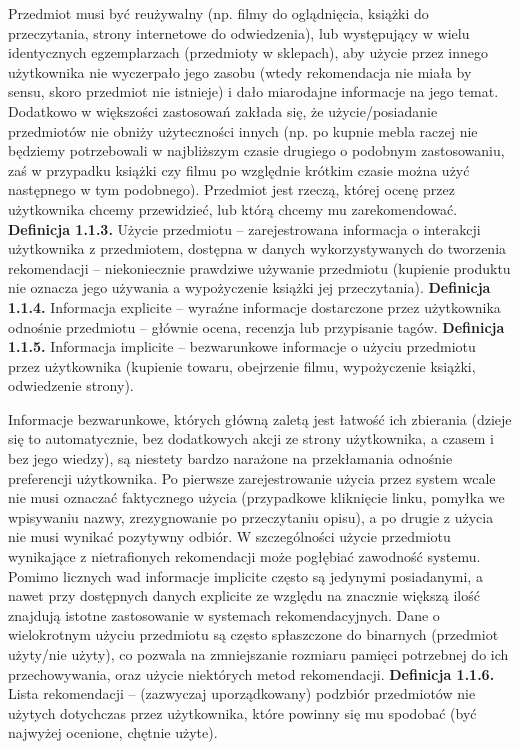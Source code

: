 \documentclass{pracamgr}
\begin{document}
    Przedmiot musi być reużywalny (np. filmy do oglądnięcia, książki do przeczytania, strony internetowe do odwiedzenia),
    lub występujący w wielu identycznych egzemplarzach (przedmioty w sklepach), aby użycie przez innego użytkownika nie wyczerpało jego zasobu
    (wtedy rekomendacja nie miała by sensu, skoro przedmiot nie istnieje) i dało miarodajne informacje na jego temat.
    Dodatkowo w większości zastosowań zakłada się, że użycie/posiadanie przedmiotów nie obniży użyteczności innych
    (np. po kupnie mebla raczej nie będziemy potrzebowali w najbliższym czasie drugiego o podobnym zastosowaniu,
    zaś w przypadku książki czy filmu po względnie krótkim czasie można użyć następnego w tym podobnego).
    Przedmiot jest rzeczą, której ocenę przez użytkownika chcemy przewidzieć, lub którą chcemy mu zarekomendować.\newline\newline
   \textbf{Definicja 1.1.3.} Użycie przedmiotu -- zarejestrowana informacja o interakcji użytkownika z przedmiotem,
   dostępna w danych wykorzystywanych do tworzenia rekomendacji -- niekoniecznie prawdziwe używanie przedmiotu
   (kupienie produktu nie oznacza jego używania a wypożyczenie książki jej przeczytania). \newline\newline
   \textbf{Definicja 1.1.4.} Informacja explicite -- wyraźne informacje dostarczone przez użytkownika odnośnie przedmiotu -- głównie
    ocena, recenzja lub przypisanie tagów.\newline\newline
   \textbf{Definicja 1.1.5.} Informacja implicite -- bezwarunkowe informacje o użyciu przedmiotu przez użytkownika
    (kupienie towaru, obejrzenie filmu, wypożyczenie książki, odwiedzenie strony).\newline
    
    Informacje bezwarunkowe, których główną zaletą jest łatwość ich zbierania
    (dzieje się to automatycznie, bez dodatkowych akcji ze strony użytkownika, a czasem i bez jego wiedzy),
    są niestety bardzo narażone na przekłamania odnośnie preferencji użytkownika.
    Po pierwsze zarejestrowanie użycia przez system wcale nie musi oznaczać faktycznego użycia
    (przypadkowe kliknięcie linku, pomyłka we wpisywaniu nazwy, zrezygnowanie po przeczytaniu opisu), 
    a po drugie z użycia nie musi wynikać pozytywny odbiór.
    W szczególności użycie przedmiotu wynikające z nietrafionych rekomendacji może pogłębiać zawodność systemu.
    Pomimo licznych wad informacje implicite często są jedynymi posiadanymi, a nawet przy dostępnych danych explicite ze względu na
    znacznie większą ilość znajdują istotne zastosowanie w systemach rekomendacyjnych.
    Dane o wielokrotnym użyciu przedmiotu są często spłaszczone do binarnych (przedmiot użyty/nie użyty),
    co pozwala na zmniejszanie rozmiaru pamięci potrzebnej do ich przechowywania, oraz użycie niektórych metod rekomendacji.\newline\newline
   \textbf{Definicja 1.1.6.} Lista rekomendacji -- (zazwyczaj uporządkowany) podzbiór przedmiotów nie użytych dotychczas przez użytkownika,
    które powinny się mu spodobać (być najwyżej ocenione, chętnie użyte).
    
\end{document}
